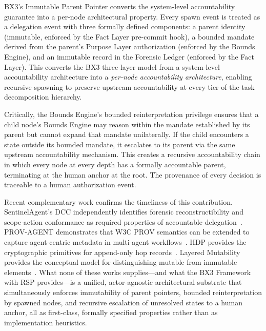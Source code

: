 BX3's Immutable Parent Pointer converts the system-level accountability guarantee into a per-node architectural property. Every spawn event is treated as a delegation event with three formally defined components: a parent identity (immutable, enforced by the Fact Layer pre-commit hook), a bounded mandate derived from the parent's Purpose Layer authorization (enforced by the Bounds Engine), and an immutable record in the Forensic Ledger (enforced by the Fact Layer). This converts the BX3 three-layer model from a system-level accountability architecture into a \emph{per-node accountability architecture}, enabling recursive spawning to preserve upstream accountability at every tier of the task decomposition hierarchy.

Critically, the Bounds Engine's bounded reinterpretation privilege ensures that a child node's Bounds Engine may reason within the mandate established by its parent but cannot expand that mandate unilaterally. If the child encounters a state outside its bounded mandate, it escalates to its parent via the same upstream accountability mechanism. This creates a recursive accountability chain in which every node at every depth has a formally accountable parent, terminating at the human anchor at the root. The provenance of every decision is traceable to a human authorization event.

Recent complementary work confirms the timeliness of this contribution. SentinelAgent's DCC independently identifies forensic reconstructibility and scope-action conformance as required properties of accountable delegation~\cite{sentinelagent}. PROV-AGENT demonstrates that W3C PROV semantics can be extended to capture agent-centric metadata in multi-agent workflows~\cite{prov-agent2025}. HDP provides the cryptographic primitives for append-only hop records~\cite{hdp-draft}. Layered Mutability provides the conceptual model for distinguishing mutable from immutable elements~\cite{layeredmutability2026}. What none of these works supplies---and what the BX3 Framework with RSP provides---is a unified, actor-agnostic architectural substrate that simultaneously enforces immutability of parent pointers, bounded reinterpretation by spawned nodes, and recursive escalation of unresolved states to a human anchor, all as first-class, formally specified properties rather than as implementation heuristics.
